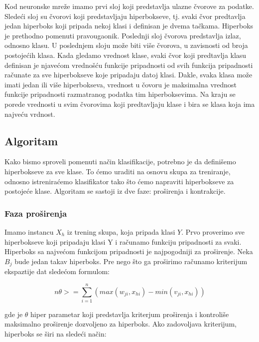 \documentclass[a4paper]{article}
\begin{document}
Kod neuronske mreže imamo prvi sloj koji predstavlja ulazne čvorove za podatke. Sledeći sloj su čvorovi koji predstavljaju hiperbokseve, tj. 
svaki čvor predtavlja jedan hiperboks koji pripada nekoj klasi i definisan je dvema tačkama. Hiperboks je prethodno pomenuti 
pravougaonik. Poslednji sloj čvorova predstavlja izlaz, odnosno klasu. U poslednjem sloju može biti više čvorova, u zavisnosti od broja 
postojećih klasa. Kada gledamo vrednost klase, svaki čvor koji predtavlja klasu definisan je njavećom vrednošću funkcije pripadnosti od 
svih funkcija pripadnosti računate za sve hiperbokseve koje pripadaju datoj klasi. Dakle, svaka klasa može imati jedan ili više hiperbokseva, 
vrednost u čovoru je maksimalna vrednost funkcije pripadnosti razmatranog podatka tim hiperboksevima. Na kraju se porede vrednosti u 
svim čvorovima koji predtavljaju klase i bira se klasa koja ima najveću vrdnost. \cite{mmf}

\subsection{Algoritam}
\label{algoritam}

Kako bismo sproveli pomenuti način klasifikacije, potrebno je da definišemo hiperbokseve za sve klase. To ćemo uraditi na osnovu skupa za 
treniranje, odnosno istreniraćemo klasifikator tako što ćemo napraviti hiperbokseve za postojeće klase. Algoritam se sastoji iz dve faze: 
proširenja i kontrakcije. \cite{mmf}

\subsubsection{Faza proširenja}
\label{prosirenje}

Imamo instancu $X_h$ iz trening skupa, koja pripada klasi $Y$. Prvo proverimo sve hiperbokseve koji pripadaju klasi Y i računamo funkciju 
pripadnosti za svaki. Hiperboks sa najvećom funkcijom pripadnosti je najpogodniji za proširenje. Neka $B_j$ bude jedan takav hiperboks. 
Pre nego što ga proširimo računamo kriterijum ekspaztije dat sledećom formulom:

\begin{equation}
    n\theta >= \sum_{i=1}^{n}(max(w_{ji}, x_{hi}) - min(v_{ji}, x_{hi}))
\end{equation}

gde je $\theta$ hiper parametar koji predstavlja kriterjum proširenja i kontroliše maksimalno proširenje dozvoljeno za hiperboks. Ako 
zadovoljava kriterijum, hiperboks se širi na sledeći način:
\end{document}
